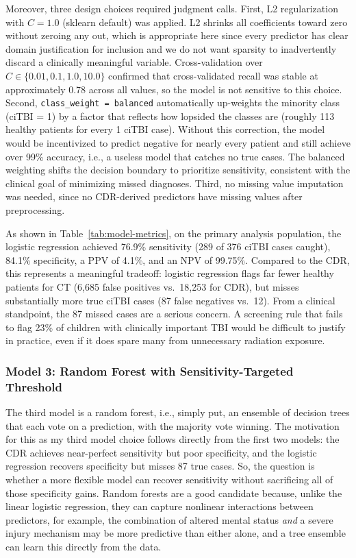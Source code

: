 \documentclass[11pt,letterpaper]{article}
\begin{document}
Moreover, three design choices required judgment calls. First, L2 regularization with $C = 1.0$ (sklearn default) was applied. L2 shrinks all coefficients toward zero without zeroing any out, which is appropriate here since every predictor has clear domain justification for inclusion and we do not want sparsity to inadvertently discard a clinically meaningful variable. Cross-validation over $C \in \{0.01, 0.1, 1.0, 10.0\}$ confirmed that cross-validated recall was stable at approximately 0.78 across all values, so the model is not sensitive to this choice. Second, \texttt{class\_weight = balanced} automatically up-weights the minority class (ciTBI = 1) by a factor that reflects how lopsided the classes are (roughly 113 healthy patients for every 1 ciTBI case). Without this correction, the model would be incentivized to predict negative for nearly every patient and still achieve over 99\% accuracy, i.e., a useless model that catches no true cases. The balanced weighting shifts the decision boundary to prioritize sensitivity, consistent with the clinical goal of minimizing missed diagnoses. Third, no missing value imputation was needed, since no CDR-derived predictors have missing values after preprocessing. 

As shown in Table~\ref{tab:model-metrics}, on the primary analysis population, the logistic regression achieved 76.9\% sensitivity (289 of 376 ciTBI cases caught), 84.1\% specificity, a PPV of 4.1\%, and an NPV of 99.75\%. Compared to the CDR, this represents a meaningful tradeoff: logistic regression flags far fewer healthy patients for CT (6,685 false positives vs.\ 18,253 for CDR), but misses substantially more true ciTBI cases (87 false negatives vs.\ 12). From a clinical standpoint, the 87 missed cases are a serious concern. A screening rule that fails to flag 23\% of children with clinically important TBI would be difficult to justify in practice, even if it does spare many from unnecessary radiation exposure.

\subsubsection*{Model 3: Random Forest with Sensitivity-Targeted Threshold}

The third model is a random forest, i.e., simply put, an ensemble of decision trees that each vote on a prediction, with the majority vote winning. The motivation for this as my third model choice follows directly from the first two models: the CDR achieves near-perfect sensitivity but poor specificity, and the logistic regression recovers specificity but misses 87 true cases. So, the question is whether a more flexible model can recover sensitivity without sacrificing all of those specificity gains. Random forests are a good candidate because, unlike the linear logistic regression, they can capture nonlinear interactions between predictors, for example, the combination of altered mental status \textit{and} a severe injury mechanism may be more predictive than either alone, and a tree ensemble can learn this directly from the data. 
\end{document}
